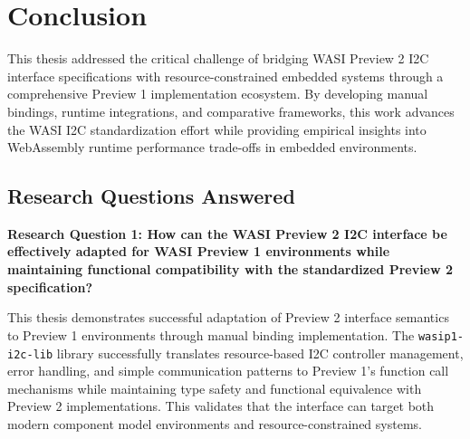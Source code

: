 \chapter*{Conclusion}
\label{chap:conclusion}

This thesis addressed the critical challenge of bridging WASI Preview 2 I2C interface specifications with resource-constrained embedded systems through a comprehensive Preview 1 implementation ecosystem. By developing manual bindings, runtime integrations, and comparative frameworks, this work advances the WASI I2C standardization effort while providing empirical insights into WebAssembly runtime performance trade-offs in embedded environments.




\section*{Research Questions Answered}
\label{sec:research-questions-answered}

\textbf{Research Question 1: How can the WASI Preview 2 I2C interface be effectively adapted for WASI Preview 1 environments while maintaining functional compatibility with the standardized Preview 2 specification?}

This thesis demonstrates successful adaptation of Preview 2 interface semantics to Preview 1 environments through manual binding implementation. The \texttt{wasip1-i2c-lib} library successfully translates resource-based I2C controller management, error handling, and simple communication patterns to Preview 1's function call mechanisms while maintaining type safety and functional equivalence with Preview 2 implementations. This validates that the interface can target both modern component model environments and resource-constrained systems.

